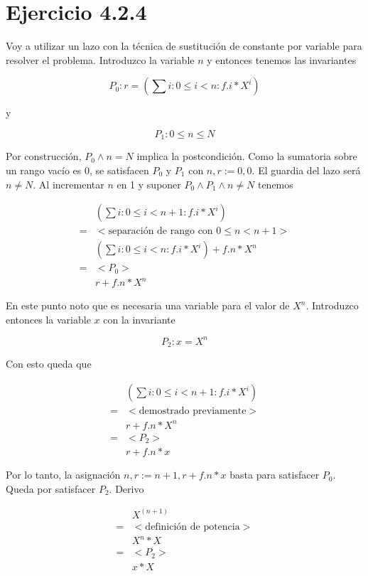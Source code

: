 \documentclass{article}
\begin{document}
\section{Ejercicio 4.2.4}

Voy a utilizar un lazo con la técnica de sustitución de constante por variable
para resolver el problema. Introduzco la variable $n$ y entonces tenemos
las invariantes

$$
P_0: r = (\sum i : 0 \leq i < n : f.i * X^i)
$$

y

$$
P_1: 0 \leq n \leq N
$$

Por construcción, $P_0 \wedge n = N$ implica la postcondición. Como la sumatoria
sobre un rango vacío es 0, se satisfacen $P_0$ y $P_1$ con $n, r := 0, 0$. El
guardia del lazo será $n \neq N$. Al incrementar $n$ en 1 y suponer
$P_0 \wedge P_1 \wedge n \neq N$ tenemos 

\begin{align*}
 & (\sum i : 0 \leq i < n + 1: f.i * X^i) \\
 = & <\text{separación de rango con } 0 \leq n < n+ 1> \\
 & (\sum i : 0 \leq i < n : f.i * X^i) + f.n * X^n \\
 = & <P_0> \\
 & r + f.n * X^n
\end{align*}

En este punto noto que es necesaria una variable para el valor de $X^n$.
Introduzco entonces la variable $x$ con la invariante

$$
P_2: x = X^n
$$

Con esto queda que

\begin{align*}
 & (\sum i : 0 \leq i < n + 1: f.i * X^i) \\
 = & <\text{demostrado previamente}> \\
 & r + f.n * X^n \\
 = & <P_2> \\
 & r + f.n * x
\end{align*}

Por lo tanto, la asignación $n, r := n + 1, r + f.n * x$ basta para
satisfacer $P_0$. Queda por satisfacer $P_2$. Derivo

\begin{align*}
 & X^{(n+1)} \\
 = & <\text{definición de potencia}> \\
 & X^n * X \\
 = & <P_2> \\
 & x * X
\end{align*}
\end{document}
